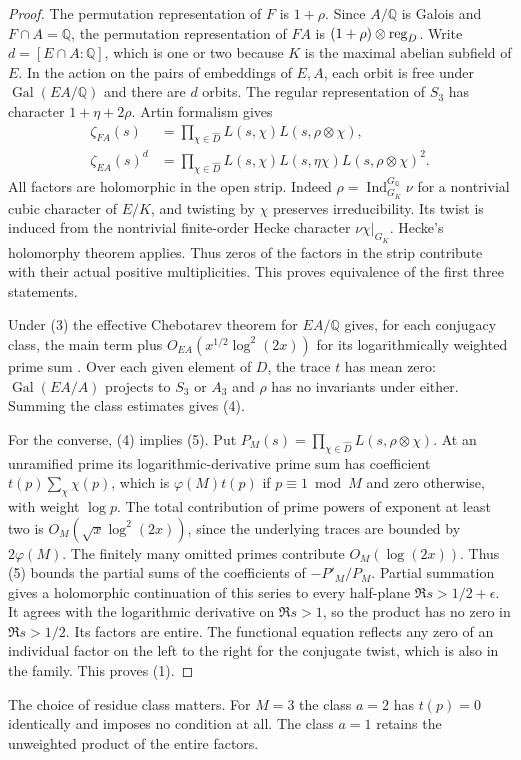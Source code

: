 \documentclass[11pt]{article}
\newcommand{\Q}{\mathbb Q}
\newcommand{\Gal}{\operatorname{Gal}}
\begin{document}
\begin{proof}
The permutation representation of $F$ is $1+\rho$. Since $A/\Q$ is
Galois and $F\cap A=\Q$, the permutation representation of $FA$
is $(1+\rho)\otimes{\rm reg}_D$. Write $d=[E\cap A:\Q]$, which
is one or two because $K$ is the maximal abelian subfield of $E$.
In the action on the pairs of embeddings of $E,A$, each orbit is free
under $\Gal(EA/\Q)$ and there are $d$ orbits. The regular representation
of $S_3$ has character $1+\eta+2\rho$. Artin formalism gives
\begin{align*}
\zeta_{FA}(s)&=\prod_{\chi\in\widehat D}L(s,\chi)L(s,\rho\otimes\chi),\\
\zeta_{EA}(s)^d&=\prod_{\chi\in\widehat D}L(s,\chi)L(s,\eta\chi)
                                    L(s,\rho\otimes\chi)^2 .
\end{align*}
All factors are holomorphic in the open strip. Indeed
$\rho=\operatorname{Ind}_{G_K}^{G_{\Q}}\nu$ for a nontrivial cubic
character of $E/K$, and twisting by $\chi$ preserves irreducibility.
Its twist is induced from the nontrivial finite-order Hecke character
$\nu\chi|_{G_K}$. Hecke's holomorphy theorem applies. Thus zeros of the
factors in the strip contribute with their actual positive multiplicities.
This proves equivalence of the first three statements.

Under (3) the effective Chebotarev theorem for $EA/\Q$ gives, for each
conjugacy class, the main term plus $O_{EA}(x^{1/2}\log^2(2x))$ for its
logarithmically weighted prime sum \cite{LO}. Over each given element
of $D$, the trace $t$ has mean zero: $\Gal(EA/A)$ projects to $S_3$
or $A_3$ and $\rho$ has no invariants under either. Summing the class
estimates gives (4).

For the converse, (4) implies (5). Put
$P_M(s)=\prod_{\chi\in\widehat D} L(s,\rho\otimes\chi)$.
At an unramified prime its logarithmic-derivative prime sum has
coefficient $t(p)\sum_\chi\chi(p)$, which is $\varphi(M)t(p)$ if
$p\equiv1\bmod M$ and zero otherwise, with weight $\log p$.
The total contribution of prime powers of exponent at least two is
$O_M(\sqrt{x}\log^2(2x))$, since the underlying traces are bounded
by $2\varphi(M)$. The finitely many omitted primes contribute
$O_M(\log(2x))$. Thus (5) bounds the partial sums of the coefficients
of $-P'_M/P_M$. Partial summation gives a holomorphic
continuation of this series to every half-plane $\Re s>1/2+\epsilon$.
It agrees with the logarithmic derivative on $\Re s>1$, so the product
has no zero in $\Re s>1/2$. Its factors are entire. The
functional equation reflects any zero of an individual factor
on the left to the right for the conjugate twist, which is also in the
family. This proves (1).
\end{proof}
The choice of residue class matters. For $M=3$ the class $a=2$
has $t(p)=0$ identically and imposes no condition at all. The
class $a=1$ retains the unweighted product of the entire factors.
\end{document}
